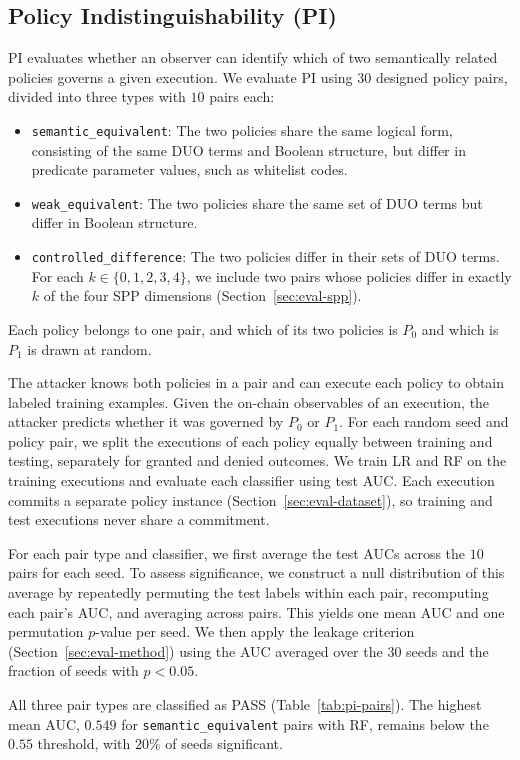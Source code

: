 \subsection{Policy Indistinguishability (PI)}
\label{sec:eval-pi}

PI evaluates whether an observer can identify which of two semantically related policies governs a given execution.
We evaluate PI using $30$ designed policy pairs, divided into three types with $10$ pairs each:
\begin{itemize}
	\item \texttt{semantic\_equivalent}: The two policies share the same logical form, consisting of the same DUO terms and Boolean structure, but differ in predicate parameter values, such as whitelist codes.
	\item \texttt{weak\_equivalent}: The two policies share the same set of DUO terms but differ in Boolean structure.
	\item \texttt{controlled\_difference}: The two policies differ in their sets of DUO terms. For each $k \in \{0,1,2,3,4\}$, we include two pairs whose policies differ in exactly $k$ of the four SPP dimensions (Section~\ref{sec:eval-spp}).
\end{itemize}
Each policy belongs to one pair, and which of its two policies is $P_0$ and which is $P_1$ is drawn at random.

The attacker knows both policies in a pair and can execute each policy to obtain labeled training examples.
Given the on-chain observables of an execution, the attacker predicts whether it was governed by $P_0$ or $P_1$.
For each random seed and policy pair, we split the executions of each policy equally between training and testing, separately for granted and denied outcomes.
We train LR and RF on the training executions and evaluate each classifier using test AUC.
Each execution commits a separate policy instance (Section~\ref{sec:eval-dataset}), so training and test executions never share a commitment.

For each pair type and classifier, we first average the test AUCs across the $10$ pairs for each seed.
To assess significance, we construct a null distribution of this average by repeatedly permuting the test labels within each pair, recomputing each pair's AUC, and averaging across pairs.
This yields one mean AUC and one permutation $p$-value per seed.
We then apply the leakage criterion (Section~\ref{sec:eval-method}) using the AUC averaged over the $30$ seeds and the fraction of seeds with $p<0.05$.

All three pair types are classified as PASS (Table~\ref{tab:pi-pairs}).
The highest mean AUC, $0.549$ for \texttt{semantic\_equivalent} pairs with RF, remains below the $0.55$ threshold, with $20\%$ of seeds significant.
